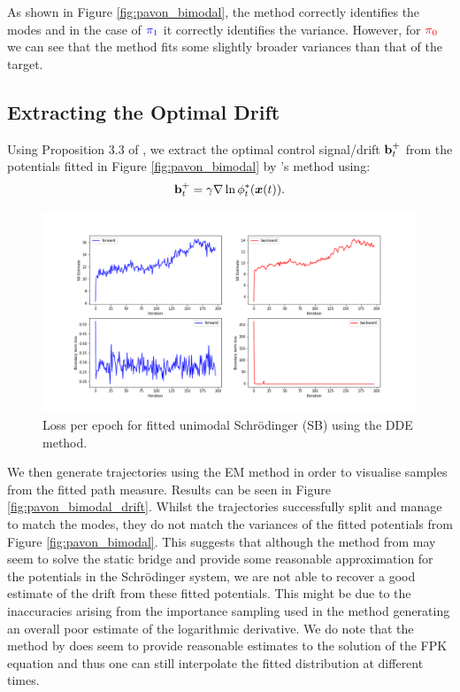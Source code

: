 \documentclass[a4paper,12pt,twoside,openright]{report}
\theoremstyle{definition}
\begin{document}
As shown in Figure \ref{fig:pavon_bimodal}, the method correctly identifies the modes and in the case of $\color{blue}{\pi_1}$ it correctly identifies the variance. However, for $\color{red}{\pi_0}$ we can see that the method fits some slightly broader variances than that of the target. 
\subsection{Extracting the Optimal Drift}

Using Proposition 3.3 of \cite{pavon1991free}, we extract the optimal control signal/drift ${\mathbf{b}}_t^+$ from the potentials fitted in Figure \ref{fig:pavon_bimodal} by \cite{pavon2018data}'s method using: 
\begin{align*} 
    {\mathbf{b}}_t^{+} = \gamma \nabla \ln \phi^*_t({\bm{x}}(t)).
\end{align*}
\begin{figure}
    \centering
    \includegraphics[scale=0.4,trim={2.3cm 1cm 2.5cm 0}, clip]{images/GP/SB_gp_bigvar_epochs_samp_200.png}
    \caption{Loss per epoch for fitted unimodal Schrödinger (SB) using the DDE method.}
    \label{fig:epochsbigvargp}
\end{figure}
We then generate trajectories using the EM method in order to visualise samples from the fitted path measure. Results can be seen in Figure \ref{fig:pavon_bimodal_drift}. Whilst the trajectories successfully split and manage to match the modes, they do not match the variances of the fitted potentials from Figure \ref{fig:pavon_bimodal}. This suggests that although the method from \cite{pavon2018data} may seem to solve the static bridge and provide some reasonable approximation for the potentials in the Schrödinger system, we are not able to recover a good estimate of the drift from these fitted potentials. This might be due to the inaccuracies arising from the importance sampling used in the method generating an overall poor estimate of the logarithmic derivative. We do note that the method by \cite{pavon2018data} does seem to provide reasonable estimates to the solution of the FPK equation and thus one can still interpolate the fitted distribution at different times.
\end{document}

